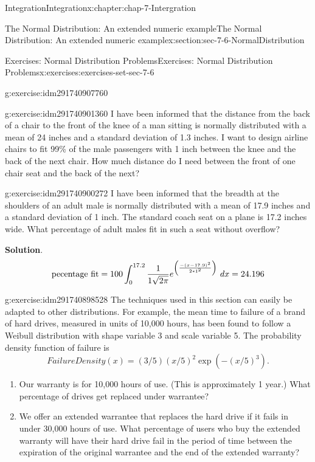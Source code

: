 \documentclass[oneside,10pt,]{book}
\numberwithin{equation}{section}
\begin{document}
\begin{chapterptx}{Integration}{}{Integration}{}{}{x:chapter:chap-7-Intergration}
\begin{sectionptx}{The Normal Distribution: An extended numeric example}{}{The Normal Distribution: An extended numeric example}{}{}{x:section:sec-7-6-NormalDistribution}
\begin{exercises-subsection}{Exercises: Normal Distribution Problems}{}{Exercises: Normal Distribution Problems}{}{}{x:exercises:exercises-set-sec-7-6}
\begin{divisionexercise}{9}{}{}{g:exercise:idm291740907760}
\end{divisionexercise}%
\begin{divisionexercise}{10}{}{}{g:exercise:idm291740901360}%
I have been informed that the distance from the back of a chair to the front of the knee of a man sitting is normally distributed with a mean of 24 inches and a standard deviation of 1.3 inches.  I want to design airline chairs to fit 99\% of the male passengers with 1 inch between the knee and the back of the next chair.  How much distance do I need between the front of one chair seat and the back of the next?%
\end{divisionexercise}%
\begin{divisionexercise}{11}{}{}{g:exercise:idm291740900272}%
I have been informed that the breadth at the shoulders of an adult male is normally distributed with a mean of 17.9 inches and a standard deviation of 1 inch.  The standard coach seat on a plane is 17.2 inches wide.  What percentage of adult males fit in such a seat without overflow?%
\par\smallskip%
\noindent\textbf{Solution}.\hypertarget{g:solution:idm291740899472}{}\quad{}%
\begin{equation*}
\hbox{pecentage fit}=100\int_{0}^{17.2}\frac{1}{1\sqrt{2\pi}} e^{\left({\frac{-(x-17.9)^2}{2*1^2}}\right)}\ dx =24.196
\end{equation*}
\end{divisionexercise}%
\begin{divisionexercise}{12}{}{}{g:exercise:idm291740898528}%
The techniques used in this section can easily be adapted to other distributions.  For example, the mean time to failure of a brand of hard drives, measured in units of 10,000 hours, has been found to follow a Weibull distribution with shape variable 3 and scale variable 5.  The probability density function of failure is%
%
\begin{equation*}
FailureDensity(x)=(3/5) (x/5)^2 \exp(-(x/5)^3 ).
\end{equation*}
%
\begin{enumerate}[label=(\alph*)]
\item{}Our warranty is for 10,000 hours of use.  (This is approximately 1 year.)  What percentage of drives get replaced under warrantee?%
\item{}We offer an extended warrantee that replaces the hard drive if it fails in under 30,000 hours of use.  What percentage of users who buy the extended warranty will have their hard drive fail in the period of time between the expiration of the original warrantee and the end of the extended warranty?%

\end{enumerate}
\end{divisionexercise}
\end{exercises-subsection}
\end{sectionptx}
\end{chapterptx}
\end{document}
